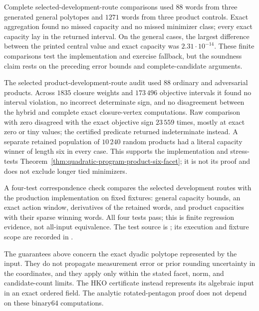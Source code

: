 Complete selected-development-route comparisons used \(88\) words from three generated general
polytopes and \(1271\) words from three product controls.  Exact aggregation
found no missed capacity and no missed minimizer class; every exact capacity
lay in the returned interval.  On the general cases, the largest difference
between the printed central value and exact capacity was \(2.31\cdot10^{-14}\).
These finite comparisons test the implementation and exercise fallback, but
the soundness claim rests on the preceding error bounds and complete-candidate
arguments.

The selected product-development-route audit used \(88\) ordinary and adversarial products.  Across
\(1835\) closure weights and \(173\,496\) objective intervals it found no
interval violation, no incorrect determinate sign, and no disagreement between
the hybrid and complete exact closure-vertex computations.  Raw comparison
with zero disagreed with the exact objective sign \(23\,559\) times, mostly at
exact zero or tiny values; the certified predicate returned indeterminate
instead.  A separate retained population of \(10\,240\) random products had a
literal capacity winner of length six in every case.  This supports the
implementation and stress-tests
Theorem~\ref{thm:quadratic-program-product-six-facet}; it is not its proof and
does not exclude longer tied minimizers.

A four-test correspondence check compares the selected development routes
with the production implementation on fixed fixtures: general capacity bounds,
an exact action window, derivatives of the retained words, and product capacities
with their sparse winning words. All four tests pass; this is finite regression
evidence, not all-input equivalence. The test source is
;
its execution and fixture scope are recorded in
.

The guarantees above concern the exact dyadic polytope represented by the
input.  They do not propagate measurement error or prior rounding uncertainty
in the coordinates, and they apply only within the stated facet, norm, and
candidate-count limits.  The HKO certificate instead represents its algebraic input in an exact
ordered field.  The analytic rotated-pentagon proof does not depend on
these binary64 computations.
